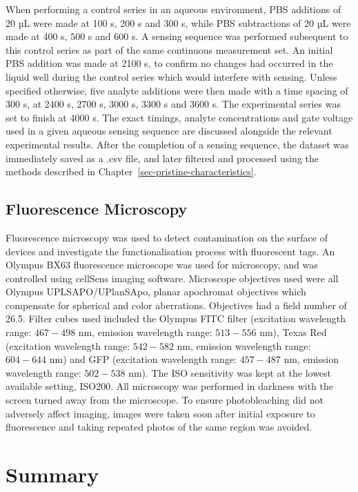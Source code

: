 \documentclass[
  a4paper,
]{scrbook}
\begin{document}
When performing a control series in an aqueous environment, PBS
additions of 20 µL were made at 100 s, 200 s and 300 s, while PBS
subtractions of 20 µL were made at 400 s, 500 s and 600 s. A sensing
sequence was performed subsequent to this control series as part of the
same continuous measurement set. An initial PBS addition was made at
2100 s, to confirm no changes had occurred in the liquid well during the
control series which would interfere with sensing. Unless specified
otherwise, five analyte additions were then made with a time spacing of
300 s, at 2400 s, 2700 s, 3000 s, 3300 s and 3600 s. The experimental
series was set to finish at 4000 s. The exact timings, analyte
concentrations and gate voltage used in a given aqueous sensing sequence
are discussed alongside the relevant experimental results. After the
completion of a sensing sequence, the dataset was immediately saved as a
.csv file, and later filtered and processed using the methods described
in Chapter~\ref{sec-pristine-characteristics}.

\hypertarget{sec-fluorescence-characterisation}{%
\subsection{Fluorescence
Microscopy}\label{sec-fluorescence-characterisation}}

Fluorescence microscopy was used to detect contamination on the surface
of devices and investigate the functionalisation process with
fluorescent tags. An Olympus BX63 fluorescence microscope was used for
microscopy, and was controlled using cellSens imaging software.
Microscope objectives used were all Olympus UPLSAPO/UPlanSApo, planar
apochromat objectives which compensate for spherical and color
aberrations. Objectives had a field number of 26.5. Filter cubes used
included the Olympus FITC filter (excitation wavelength range:
\(467-498\) nm, emission wavelength range: \(513-556\) nm), Texas Red
(excitation wavelength range: \(542-582\) nm, emission wavelength range:
\(604-644\) nm) and GFP (excitation wavelength range: \(457-487\) nm,
emission wavelength range: \(502-538\) nm). The ISO sensitivity was kept
at the lowest available setting, ISO200. All microscopy was performed in
darkness with the screen turned away from the microscope. To ensure
photobleaching did not adversely affect imaging, images were taken soon
after initial exposure to fluorescence and taking repeated photos of the
same region was avoided.

\hypertarget{summary-2}{%
\section{Summary}\label{summary-2}}
\end{document}
